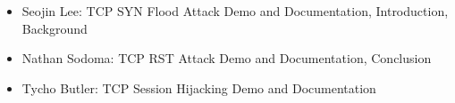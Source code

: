 \begin{itemize}
    \item Seojin Lee: TCP SYN Flood Attack Demo and Documentation, Introduction, Background
    \item Nathan Sodoma: TCP RST Attack Demo and Documentation, Conclusion
    \item Tycho Butler: TCP Session Hijacking Demo and Documentation
\end{itemize}